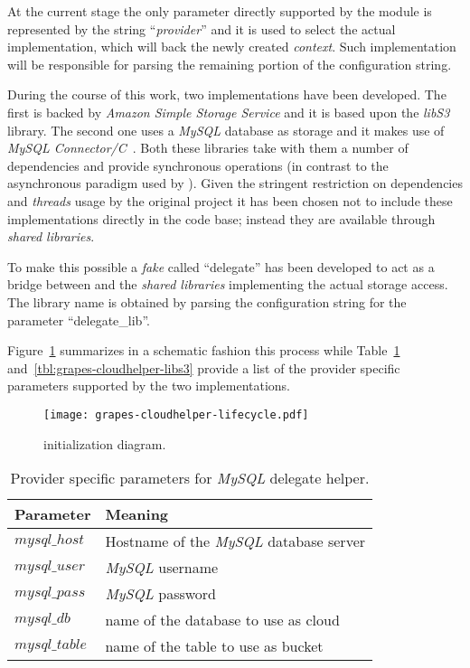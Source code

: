 At the current stage the only parameter directly supported by the
\cloudhelper module is represented by the string ``\textit{provider}''
and it is used to select the actual implementation, which will back the
newly created \textit{context}. Such implementation will be
responsible for parsing the remaining portion of the configuration
string.

During the course of this work, two \cloudhelper implementations have been
developed. The first is backed by \textit{Amazon Simple Storage
  Service}  and it is based upon the \textit{libS3}~\cite{LibS3} library. The
second one uses a \textit{MySQL} database as storage and it
makes use of \textit{MySQL Connector/C}~\cite{MySQLConnectorC}. Both
these libraries take with them a number of dependencies and provide
synchronous operations (in contrast to the asynchronous paradigm used
by \grapes). Given the stringent restriction on dependencies and
\textit{threads} usage by the original project it has been chosen not to
include these \cloudhelper implementations directly in the code
base; instead they are available through \textit{shared libraries}.

To make this possible a \textit{fake} \cloudhelper called ``delegate''
has been developed to act as a bridge between \grapes and the \textit{shared
  libraries} implementing the actual \cloud storage access. The
library name is obtained by parsing the configuration string for the parameter
``delegate\_lib''.

Figure~\ref{fig:grapes-cloudhelper-lifecycle} summarizes in a schematic
fashion this process while Table~\ref{tbl:grapes-cloudhelper-mysql}
and~\ref{tbl:grapes-cloudhelper-libs3} provide a list of the provider
specific parameters supported by the two implementations.

\begin{figure}[H]
  \centering
  \texttt{[image: grapes-cloudhelper-lifecycle.pdf]}
  \caption{\cloudhelper initialization diagram.}
  \label{fig:grapes-cloudhelper-lifecycle}
\end{figure}

\begin{table}[H]
  \centering
  \begin{tabular}{|l|l|}
  \hline
  Parameter & Meaning \\
  \hline
  \hline
  $mysql\_host$ & Hostname of the \textit{MySQL} database server \\
  $mysql\_user$ & \textit{MySQL} username \\
  $mysql\_pass$ & \textit{MySQL} password \\
  $mysql\_db$ & name of the database to use as cloud \\
  $mysql\_table$ & name of the table to use as bucket \\
  \hline
  \end{tabular}
  \caption{Provider specific parameters for \textit{MySQL} delegate helper.}
  \label{tbl:grapes-cloudhelper-mysql}
\end{table}

